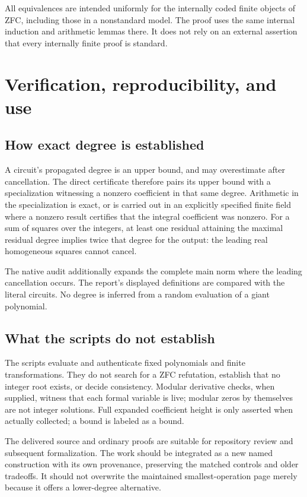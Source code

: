 \documentclass[11pt,letterpaper]{article}
\theoremstyle{definition}\newtheorem{definition}[theorem]{Definition}
\theoremstyle{remark}\newtheorem{remark}[theorem]{Remark}
\begin{document}
All equivalences are intended uniformly for the internally coded finite objects of ZFC, including those in a nonstandard model. The proof uses the same internal induction and arithmetic lemmas there. It does not rely on an external assertion that every internally finite proof is standard.

\section{Verification, reproducibility, and use}\label{sec:verification}


\subsection{How exact degree is established}
A circuit's propagated degree is an upper bound, and may overestimate after cancellation. The direct certificate therefore pairs its upper bound with a specialization witnessing a nonzero coefficient in that same degree. Arithmetic in the specialization is exact, or is carried out in an explicitly specified finite field where a nonzero result certifies that the integral coefficient was nonzero. For a sum of squares over the integers, at least one residual attaining the maximal residual degree implies twice that degree for the output: the leading real homogeneous squares cannot cancel.

The native audit additionally expands the complete main norm where the leading cancellation occurs. The report's displayed definitions are compared with the literal circuits. No degree is inferred from a random evaluation of a giant polynomial.

\subsection{What the scripts do not establish}
The scripts evaluate and authenticate fixed polynomials and finite transformations. They do not search for a ZFC refutation, establish that no integer root exists, or decide consistency. Modular derivative checks, when supplied, witness that each formal variable is live; modular zeros by themselves are not integer solutions. Full expanded coefficient height is only asserted when actually collected; a bound is labeled as a bound.

The delivered source and ordinary proofs are suitable for repository review and subsequent formalization. The work should be integrated as a new named construction with its own provenance, preserving the matched controls and older tradeoffs. It should not overwrite the maintained smallest-operation page merely because it offers a lower-degree alternative.
\end{document}

